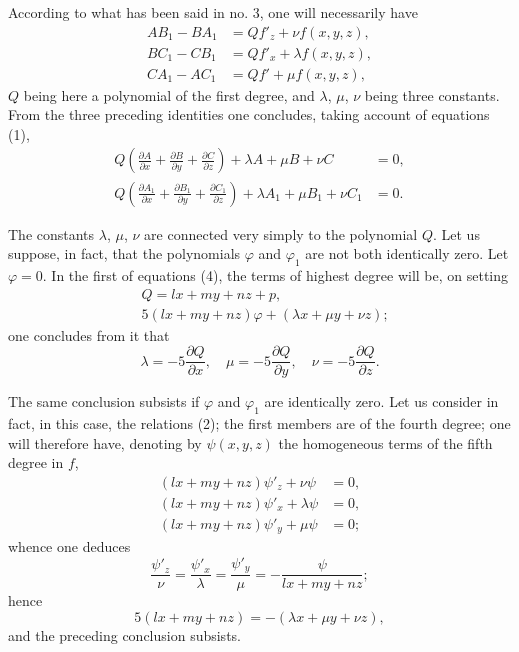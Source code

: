 \documentclass{article}
\begin{document}
According to what has been said in no. 3, one will necessarily have
\[
\begin{aligned}
AB_{1} - BA_{1} &= Qf'_{z} + \nu f(x, y, z), \\
BC_{1} - CB_{1} &= Qf'_{x} + \lambda f(x, y, z), \\
CA_{1} - AC_{1} &= Qf' + \mu f(x, y, z),
\end{aligned}
\tag{2}
\]
$Q$ being here a polynomial of the first degree, and $\lambda$, $\mu$, $\nu$ being three constants. From the three preceding identities one concludes, taking account of equations (1),
\[
\begin{aligned}
Q\left(\frac{\partial A}{\partial x} + \frac{\partial B}{\partial y} + \frac{\partial C}{\partial z}\right) + \lambda A + \mu B + \nu C &= 0, \\
Q\left(\frac{\partial A_{1}}{\partial x} + \frac{\partial B_{1}}{\partial y} + \frac{\partial C_{1}}{\partial z}\right) + \lambda A_{1} + \mu B_{1} + \nu C_{1} &= 0.
\end{aligned}
\tag{3}
\]

The constants $\lambda$, $\mu$, $\nu$ are connected very simply to the polynomial $Q$. Let us suppose, in fact, that the polynomials $\varphi$ and $\varphi_{1}$ are not both identically zero. Let $\varphi = 0$. In the first of equations (4), the terms of highest degree will be, on setting
\[
\begin{aligned}
&Q = lx + my + nz + p, \\
&5(lx + my + nz)\varphi + (\lambda x + \mu y + \nu z);
\end{aligned}
\]
one concludes from it that
\[
\lambda = -5\frac{\partial Q}{\partial x}, \quad \mu = -5\frac{\partial Q}{\partial y}, \quad \nu = -5\frac{\partial Q}{\partial z}.
\]

The same conclusion subsists if $\varphi$ and $\varphi_{1}$ are identically zero. Let us consider in fact, in this case, the relations (2); the first members are of the fourth degree; one will therefore have, denoting by $\psi(x, y, z)$ the homogeneous terms of the fifth degree in $f$,
\[
\begin{aligned}
(lx + my + nz)\psi'_{z} + \nu\psi &= 0, \\
(lx + my + nz)\psi'_{x} + \lambda\psi &= 0, \\
(lx + my + nz)\psi'_{y} + \mu\psi &= 0;
\end{aligned}
\]
whence one deduces
\[
\frac{\psi'_{z}}{\nu} = \frac{\psi'_{x}}{\lambda} = \frac{\psi'_{y}}{\mu} = -\frac{\psi}{lx + my + nz};
\]
hence
\[
5(lx + my + nz) = -(\lambda x + \mu y + \nu z),
\]
and the preceding conclusion subsists.
\end{document}
